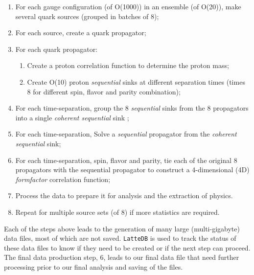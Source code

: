 \begin{enumerate}
\def\labelenumi{\arabic{enumi}.}
\tightlist
\item
  For each gauge configuration (of O(1000)) in an ensemble (of O(20)),
  make several quark sources (grouped in batches of 8);
\item
  For each source, create a quark propagator;
\item
  For each quark propagator:

  \begin{enumerate}
  \def\labelenumii{\arabic{enumii}.}
  \tightlist
  \item
    Create a proton correlation function to determine the proton mass;
  \item
    Create O(10) proton \emph{sequential} sinks at different separation
    times (times 8 for different spin, flavor and parity combination);
  \end{enumerate}
\item
  For each time-separation, group the 8 \emph{sequential} sinks from the
  8 propagators into a single \emph{coherent sequential} sink
  \cite{Bratt:2010jn};
\item
  For each time-separation, Solve a \emph{sequential} propagator from
  the \emph{coherent sequential} sink;
\item
  For each time-separation, spin, flavor and parity, tie each of the original 8 propagators with
  the sequential propagator to construct a 4-dimensional (4D)
  \emph{formfactor} correlation function;
\item
  Process the data to prepare it for analysis and the extraction of
  physics.
\item
  Repeat for multiple source sets (of 8) if more statistics are
  required.
\end{enumerate}

Each of the steps above leads to the generation of many large
(multi-gigabyte) data files, most of which are not saved.
\texttt{LatteDB} is used to track the status of these data files to know
if they need to be created or if the next step can proceed. The final
data production step, 6, leads to our final data file that need further
processing prior to our final analysis and saving of the files.

